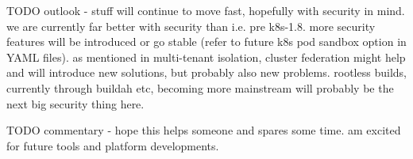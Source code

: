 TODO outlook - stuff will continue to move fast, hopefully with security in mind. we are currently far better with security than i.e. pre k8s-1.8. more security features will be introduced or go stable (refer to future k8s pod sandbox option in YAML files). as mentioned in multi-tenant isolation, cluster federation might help and will introduce new solutions, but probably also new problems. rootless builds, currently through buildah etc, becoming more mainstream will probably be the next big security thing here.

TODO commentary - hope this helps someone and spares some time. am excited for future tools and platform developments.

